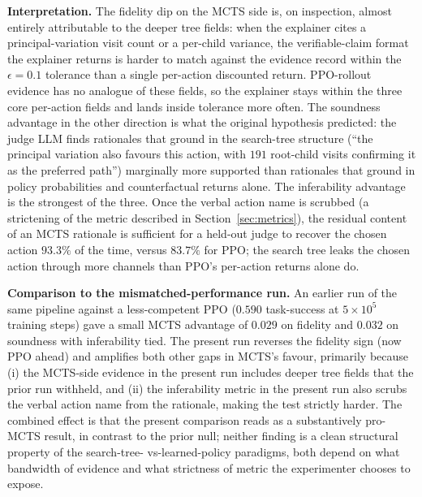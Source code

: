 \documentclass[conference]{IEEEtran}
\begin{document}
\textbf{Interpretation.} The fidelity dip on the MCTS side is, on
inspection, almost entirely attributable to the deeper tree fields:
when the explainer cites a principal-variation visit count or a
per-child variance, the verifiable-claim format the explainer
returns is harder to match against the evidence record within the
$\epsilon = 0.1$ tolerance than a single per-action discounted
return. PPO-rollout evidence has no analogue of these fields, so the
explainer stays within the three core per-action fields and lands
inside tolerance more often. The soundness advantage in the other
direction is what the original hypothesis predicted: the judge LLM
finds rationales that ground in the search-tree structure
(``the principal variation also favours this action, with $191$
root-child visits confirming it as the preferred path'') marginally
more supported than rationales that ground in policy probabilities
and counterfactual returns alone. The inferability advantage is the
strongest of the three. Once the verbal action name is scrubbed (a
strictening of the metric described in
Section~\ref{sec:metrics}), the residual content of an MCTS rationale
is sufficient for a held-out judge to recover the chosen action
$93.3\%$ of the time, versus $83.7\%$ for PPO; the search tree leaks
the chosen action through more channels than PPO's per-action
returns alone do.

\textbf{Comparison to the mismatched-performance run.} An earlier
run of the same pipeline against a less-competent PPO ($0.590$
task-success at $5\!\times\!10^{5}$ training steps) gave a small
MCTS advantage of $0.029$ on fidelity and $0.032$ on soundness with
inferability tied. The present run reverses the fidelity sign (now
PPO ahead) and amplifies both other gaps in MCTS's favour, primarily
because (i) the MCTS-side evidence in the present run includes
deeper tree fields that the prior run withheld, and (ii) the
inferability metric in the present run also scrubs the verbal action
name from the rationale, making the test strictly harder. The
combined effect is that the present comparison reads as a
substantively pro-MCTS result, in contrast to the prior null;
neither finding is a clean structural property of the search-tree-
vs-learned-policy paradigms, both depend on what bandwidth of
evidence and what strictness of metric the experimenter chooses to
expose.
\end{document}
